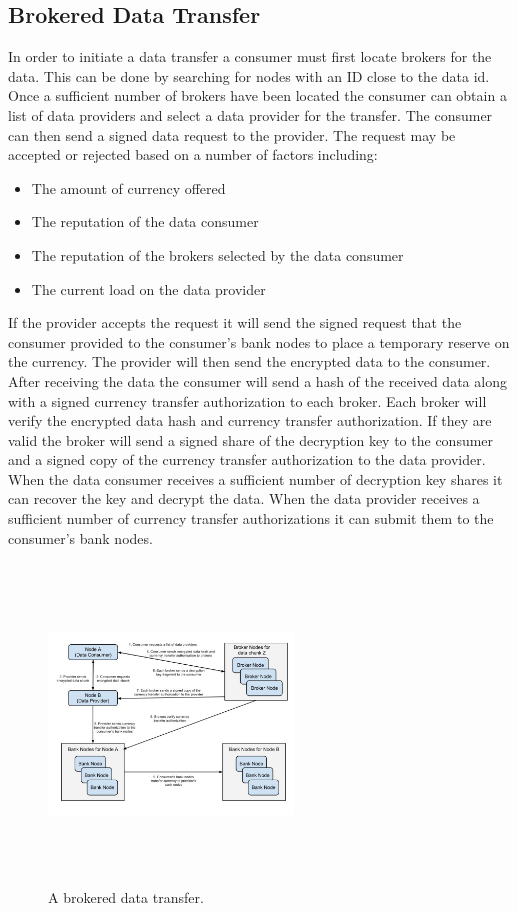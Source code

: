 \documentclass[%
				10pt,
        final,
        notitlepage,
        narroweqnarray,
        inline,
        twoside,
        ]{ieee}
\begin{document}
\subsection{Brokered Data Transfer}
In order to initiate a data transfer a consumer must first locate brokers for the data.  This can be done by searching for nodes with an ID close to the data id.  Once a sufficient number of brokers have been located the consumer can obtain a list of data providers and select a data provider for the transfer.  The consumer can then send a signed data request to the provider.  The request may be accepted or rejected based on a number of factors including:
\begin{itemize}
\item The amount of currency offered
\item The reputation of the data consumer
\item The reputation of the brokers selected by the data consumer
\item The current load on the data provider
\end{itemize}
If the provider accepts the request it will send the signed request that the consumer provided to the consumer's bank nodes to place a temporary reserve on the currency.  The provider will then send the encrypted data to the consumer.  After receiving the data the consumer will send a hash of the received data along with a signed currency transfer authorization to each broker. Each broker will verify the encrypted data hash and currency transfer authorization.  If they are valid the broker will send a signed share of the decryption key to the consumer and a signed copy of the currency transfer authorization to the data provider.  When the data consumer receives a sufficient number of decryption key shares it can recover the key and decrypt the data.  When the data provider receives a sufficient number of currency transfer authorizations it can submit them to the consumer's bank nodes.

\begin{figure}
  \begin{center}
    \includegraphics[height=85mm,width=65mm]{graphics/BrokeredDataTransfer.jpg}
  \caption{A brokered data transfer.}
  \end{center}
\end{figure}
\end{document}
